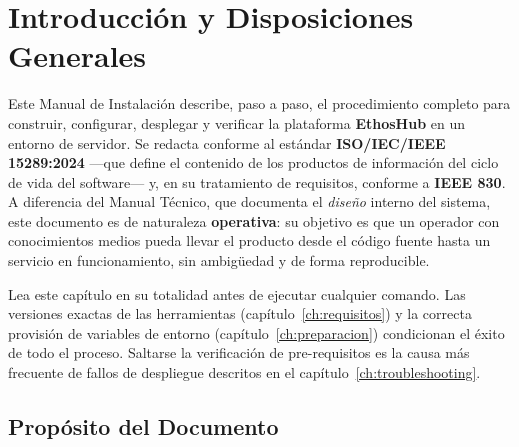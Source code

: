 \chapter[Introducción y Generalidades]{Introducción y Disposiciones Generales}%
\label{ch:introduccion}

Este Manual de Instalación describe, paso a paso, el procedimiento completo para
construir, configurar, desplegar y verificar la plataforma \textbf{EthosHub} en un
entorno de servidor. Se redacta conforme al estándar \textbf{ISO/IEC/IEEE 15289:2024}
—que define el contenido de los productos de información del ciclo de vida del software—
y, en su tratamiento de requisitos, conforme a \textbf{IEEE 830}. A diferencia del
Manual Técnico, que documenta el \textit{diseño} interno del sistema, este documento es
de naturaleza \textbf{operativa}: su objetivo es que un operador con conocimientos
medios pueda llevar el producto desde el código fuente hasta un servicio en
funcionamiento, sin ambigüedad y de forma reproducible.\par

\begin{AvisoNota}
Lea este capítulo en su totalidad antes de ejecutar cualquier comando. Las versiones
exactas de las herramientas (capítulo~\ref{ch:requisitos}) y la correcta provisión de
variables de entorno (capítulo~\ref{ch:preparacion}) condicionan el éxito de todo el
proceso. Saltarse la verificación de pre-requisitos es la causa más frecuente de fallos
de despliegue descritos en el capítulo~\ref{ch:troubleshooting}.
\end{AvisoNota}

\section{Propósito del Documento}%
\label{sec:proposito}

